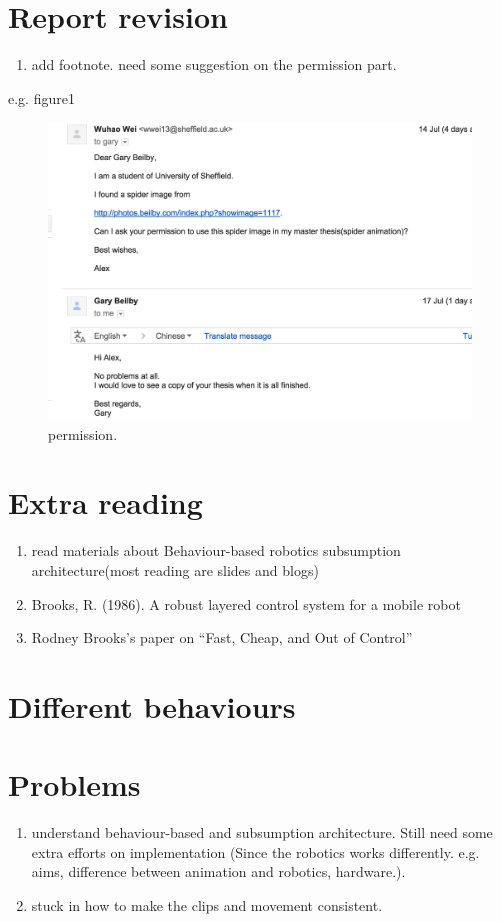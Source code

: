 \documentclass[11pt]{article}
\begin{document}
\section{Report revision}
\label{sec-2}
\begin{enumerate}
\item add footnote. need some suggestion on the permission part.
\end{enumerate}
e.g. figure1
\begin{figure}[htb]
\centering
\includegraphics[width=.9\linewidth]{./img/permission_sample.png}
\caption{\label{mylabel}permission.}
\end{figure}


\section{Extra reading}
\label{sec-3}
\begin{enumerate}
\item read materials about Behaviour-based robotics
subsumption architecture(most reading are slides and blogs)
\item Brooks, R. (1986). A robust layered control system for a mobile robot
\item Rodney Brooks’s paper on “Fast, Cheap, and Out of Control”
\end{enumerate}

\section{Different behaviours}
\label{sec-4}

\section{Problems}
\label{sec-5}
\begin{enumerate}
\item understand behaviour-based and subsumption architecture. 
Still need some extra efforts on implementation
(Since the robotics works differently. e.g. aims, difference between animation and
robotics, hardware.).

\item stuck in how to make the clips and movement consistent.
\end{enumerate}
\end{document}
